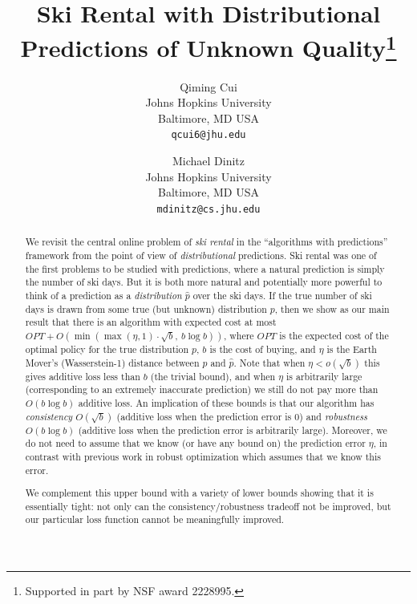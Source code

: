 \documentclass[11pt]{article}
\title{Ski Rental with Distributional Predictions of Unknown Quality\thanks{Supported in part by NSF award 2228995.}}
\author{Qiming Cui\\Johns Hopkins University\\Baltimore, MD USA\\ \texttt{qcui6@jhu.edu} \and Michael Dinitz\\Johns Hopkins University\\Baltimore, MD USA\\ \texttt{mdinitz@cs.jhu.edu}}
\date{}
\begin{document}
\maketitle

\begin{abstract}
   We revisit the central online problem of \emph{ski rental} in the ``algorithms with predictions'' framework from the point of view of \emph{distributional} predictions.  Ski rental was one of the first problems to be studied with predictions, where a natural prediction is simply the number of ski days.  But it is both more natural and potentially more powerful to think of a prediction as a \emph{distribution} $\hat p$ over the ski days.  If the true number of ski days is drawn from some true (but unknown) distribution $p$, then we show as our main result that there is an algorithm with expected cost at most $OPT + O\left(\min \left(\max(\eta,1) \cdot  \sqrt{b},\ b \log b \right) \right)$, where $OPT$ is the expected cost of the optimal policy for the true distribution $p$, $b$ is the cost of buying, and $\eta$ is the Earth Mover's (Wasserstein-1) distance between $p$ and $\hat p$.  Note that when $\eta < o(\sqrt{b})$ this gives additive loss less than $b$ (the trivial bound), and when $\eta$ is arbitrarily large (corresponding to an extremely inaccurate prediction) we still do not pay more than $O(b \log b)$ additive loss.  An implication of these bounds is that our algorithm has \emph{consistency} $O(\sqrt{b})$ (additive loss when the prediction error is $0$) and \emph{robustness} $O(b \log b)$ (additive loss when the prediction error is arbitrarily large).  Moreover, we do not need to assume that we know (or have any bound on) the prediction error $\eta$, in contrast with previous work in robust optimization which assumes that we know this error.
    
    We complement this upper bound with a variety of lower bounds showing that it is essentially tight: not only can the consistency/robustness tradeoff not be improved, but our particular loss function cannot be meaningfully improved. 
\end{abstract}












\appendix








\end{document}
